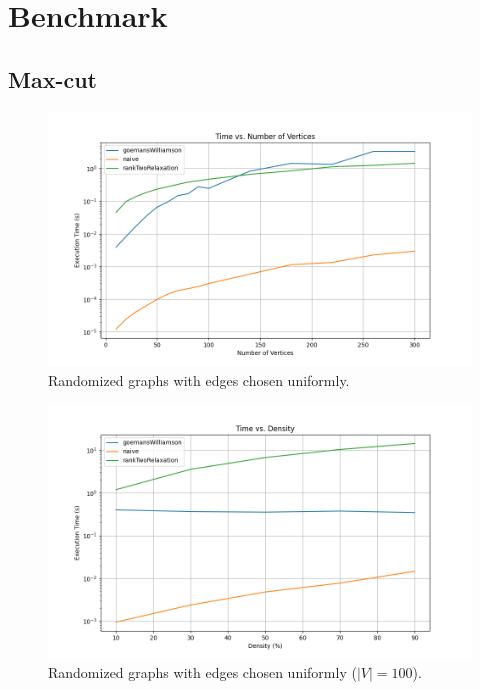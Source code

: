 \section{Benchmark}

\subsection{Max-cut}


\begin{figure}[H]
\centering
\includegraphics[width=\textwidth]{chapters/benchmark/Sections/images/cut/num_of_v/time_vs_vertices.png}
\caption{ Randomized graphs with edges chosen uniformly. }
\end{figure}

\begin{figure}[H]
\centering
\includegraphics[width=\textwidth]{chapters/benchmark/Sections/images/cut/density/time_vs_density.png}
\caption{ Randomized graphs with edges chosen uniformly (\(|V| = 100\)).}
\end{figure}

